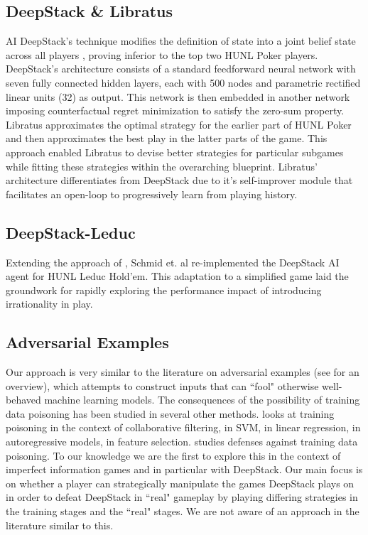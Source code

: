 \documentclass{article}
\begin{document}
\subsection{DeepStack \& Libratus}
AI DeepStack's technique modifies the definition of state into a joint belief state across all players \cite{moravvcik2017deepstack}, proving inferior to the top two HUNL Poker players. DeepStack's architecture consists of a standard feedforward neural network with seven fully connected hidden layers, each with 500 nodes and parametric rectified linear units (32) as output. This network is then embedded in another network imposing counterfactual regret minimization to satisfy the zero-sum property. Libratus approximates the optimal strategy for the earlier part of HUNL Poker and then approximates the best play in the latter parts of the game. This approach enabled Libratus to devise better strategies for particular subgames while fitting these strategies within the overarching blueprint. Libratus' architecture differentiates from DeepStack due to it's self-improver module that facilitates an open-loop to progressively learn from playing history.

\subsection{DeepStack-Leduc}
Extending the approach of \cite{brown2018depth}, Schmid et. al re-implemented the DeepStack AI agent for HUNL Leduc Hold'em. This adaptation to a simplified game laid the groundwork for rapidly exploring the performance impact of introducing irrationality in play.

\subsection{Adversarial Examples}
Our approach is very similar to the literature on adversarial examples (see \cite{yuan2017adversarial} for an overview), which attempts to construct inputs that can ``fool" otherwise well-behaved machine learning models. The consequences of the possibility of training data poisoning has been studied in several other methods. \cite{li2016data} looks at training poisoning in the context of collaborative filtering, \cite{biggio2012poisoning} in SVM, \cite{liu2017robust} in linear regression, \cite{alfeld2016data} in autoregressive models, \cite{xiao2015feature} in feature selection. \cite{steinhardt2017certified} studies defenses against training data poisoning.
To our knowledge we are the first to explore this in the context of imperfect information games and in particular with DeepStack. Our main focus is on whether a player can strategically manipulate the games DeepStack plays on in order to defeat DeepStack in ``real" gameplay by playing differing strategies in the training stages and the ``real" stages. We are not aware of an approach in the literature similar to this.
\end{document}
